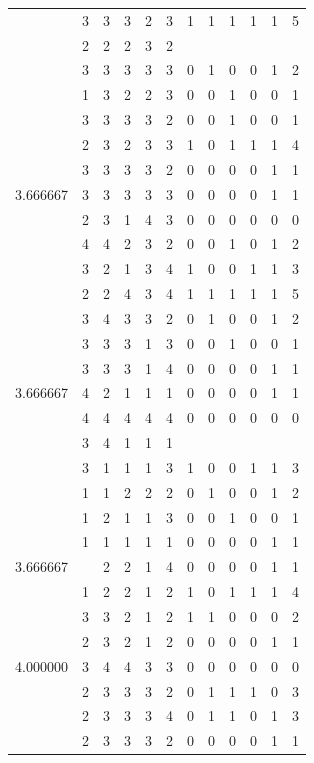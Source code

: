 \documentclass[]{book}
\theoremstyle{definition}
\theoremstyle{definition}
\theoremstyle{definition}
\theoremstyle{remark}
\begin{document}
\begin{table}
{\begin{tabular}[t]{rrrrrrrrrrrr}
 & 3 & 3 & 3 & 2 & 3 & 1 & 1 & 1 & 1 & 1 & 5\\
 & 2 & 2 & 2 & 3 & 2 &  &  &  &  &  & \\
 & 3 & 3 & 3 & 3 & 3 & 0 & 1 & 0 & 0 & 1 & 2\\
 & 1 & 3 & 2 & 2 & 3 & 0 & 0 & 1 & 0 & 0 & 1\\
 & 3 & 3 & 3 & 3 & 2 & 0 & 0 & 1 & 0 & 0 & 1\\
 & 2 & 3 & 2 & 3 & 3 & 1 & 0 & 1 & 1 & 1 & 4\\
 & 3 & 3 & 3 & 3 & 2 & 0 & 0 & 0 & 0 & 1 & 1\\
3.666667 & 3 & 3 & 3 & 3 & 3 & 0 & 0 & 0 & 0 & 1 & 1\\
 & 2 & 3 & 1 & 4 & 3 & 0 & 0 & 0 & 0 & 0 & 0\\
 & 4 & 4 & 2 & 3 & 2 & 0 & 0 & 1 & 0 & 1 & 2\\
 & 3 & 2 & 1 & 3 & 4 & 1 & 0 & 0 & 1 & 1 & 3\\
 & 2 & 2 & 4 & 3 & 4 & 1 & 1 & 1 & 1 & 1 & 5\\
 & 3 & 4 & 3 & 3 & 2 & 0 & 1 & 0 & 0 & 1 & 2\\
 & 3 & 3 & 3 & 1 & 3 & 0 & 0 & 1 & 0 & 0 & 1\\
 & 3 & 3 & 3 & 1 & 4 & 0 & 0 & 0 & 0 & 1 & 1\\
3.666667 & 4 & 2 & 1 & 1 & 1 & 0 & 0 & 0 & 0 & 1 & 1\\
 & 4 & 4 & 4 & 4 & 4 & 0 & 0 & 0 & 0 & 0 & 0\\
 & 3 & 4 & 1 & 1 & 1 &  &  &  &  &  & \\
 & 3 & 1 & 1 & 1 & 3 & 1 & 0 & 0 & 1 & 1 & 3\\
 & 1 & 1 & 2 & 2 & 2 & 0 & 1 & 0 & 0 & 1 & 2\\
 & 1 & 2 & 1 & 1 & 3 & 0 & 0 & 1 & 0 & 0 & 1\\
 & 1 & 1 & 1 & 1 & 1 & 0 & 0 & 0 & 0 & 1 & 1\\
3.666667 &  & 2 & 2 & 1 & 4 & 0 & 0 & 0 & 0 & 1 & 1\\
 & 1 & 2 & 2 & 1 & 2 & 1 & 0 & 1 & 1 & 1 & 4\\
 & 3 & 3 & 2 & 1 & 2 & 1 & 1 & 0 & 0 & 0 & 2\\
 & 2 & 3 & 2 & 1 & 2 & 0 & 0 & 0 & 0 & 1 & 1\\
4.000000 & 3 & 4 & 4 & 3 & 3 & 0 & 0 & 0 & 0 & 0 & 0\\
 & 2 & 3 & 3 & 3 & 2 & 0 & 1 & 1 & 1 & 0 & 3\\
 & 2 & 3 & 3 & 3 & 4 & 0 & 1 & 1 & 0 & 1 & 3\\
 & 2 & 3 & 3 & 3 & 2 & 0 & 0 & 0 & 0 & 1 & 1\\

\end{tabular}}
\end{table}
\end{document}
